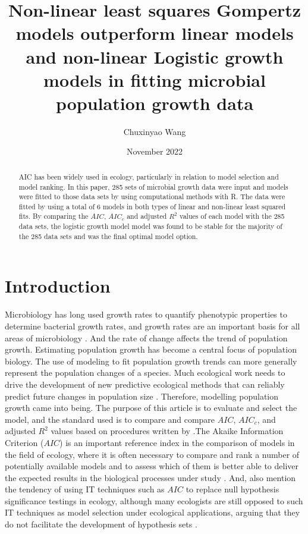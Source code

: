 \documentclass[11pt]{article}
\title{Non-linear least squares Gompertz models outperform linear models and non-linear Logistic growth models in fitting microbial population growth data}
\author{Chuxinyao Wang}
\date{November 2022}
\begin{document}
\maketitle
  
\begin{abstract}
AIC has been widely used in ecology, particularly in relation to model selection and model ranking.
In this paper, 285 sets of microbial growth data were input and models were fitted to those data sets by using computational methods with R. 
The data were fitted by using a total of 6 models in both types of linear and non-linear least squared fits. 
By comparing the $AIC$, $AIC_c$ and adjusted $R^2$ values of each model with the 285 data sets, the logistic growth model model was found to be stable for the majority of the 285 data sets and was the final optimal model option.
\end{abstract}
  
\section{Introduction}
Microbiology has long used growth rates to quantify phenotypic properties to determine bacterial growth rates, and growth rates are an important basis for all areas of microbiology \citep{10.1093/molbev/mst187}. And the rate of change affects the trend of population growth. Estimating population growth has become a central focus of population biology. The use of modeling to fit population growth trends can more generally represent the population changes of a species. Much ecological work needs to drive the development of new predictive ecological methods that can reliably predict future changes in population size \citep{matthiopoulos2019predicting}. Therefore, modelling population growth came into being. The purpose of this article is to evaluate and select the model, and the standard used is to compare and compare $AIC$, $AIC_{c}$, and adjusted $R^{2}$ values based on procedures written by \cite{johnson2004model} .The Akaike Information Criterion ($AIC$) is an important reference index in the comparison of models in the field of ecology, where it is often necessary to compare and rank a number of potentially available models and to assess which of them is better able to deliver the expected results in the biological processes under study \citep{Symonds2010ABG}. And, \cite{STEPHENS2007192} also mention the tendency of using IT techniques such as $AIC$ to replace null hypothesis significance testings in ecology, although many ecologists are still opposed to such IT techniques as model selection under ecological applications, arguing that they do not facilitate the development of hypothesis sets \citep{10.2307/3802765, ctx43114213010001591}.\\
\end{document}

